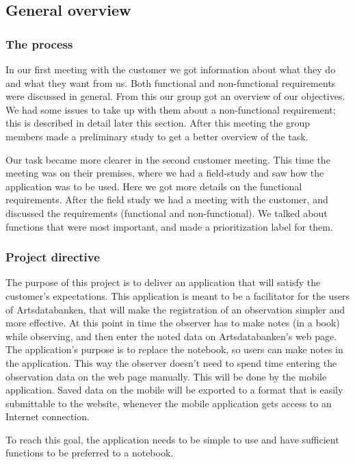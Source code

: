 \subsection{General overview}

\subsubsection{The process}
In our first meeting with the customer we got information about what they do and what they want from us.
Both functional and non-functional requirements were discussed in general.
From this our group got an overview of our objectives.
We had some issues to take up with them about a non-functional requirement; this is described in detail later this section.
After this meeting the group members made a preliminary study to get a better overview of the task.

Our task became more clearer in the second customer meeting.
This time the meeting was on their premises, where we had a field-study and saw how the
application was to be used. Here we got more details on the functional requirements.
After the field study we had a meeting with the customer, and discussed the requirements
(functional and non-functional). We talked about functions that were most important,
and made a prioritization label for them.

\subsubsection{Project directive}

The purpose of this project is to deliver an application that will satisfy the
customer's expectations.  This application is meant to be a facilitator for the
users of Artsdatabanken, that will make the registration of an observation
simpler and more effective.  At this point in time the observer has to make
notes (in a book) while observing, and then enter the noted data on
Artsdatabanken's web page.  The application's purpose is to replace the
notebook, so users can make notes in the application.  This way the observer
doesn't need to spend time entering the observation data on the web page
manually.  This will be done by the mobile application. Saved data on the
mobile will be exported to a format that is easily submittable to the website,
whenever the mobile application gets access to an Internet connection.

To reach this goal, the application needs to be simple to use and have
sufficient functions to be preferred to a notebook.



